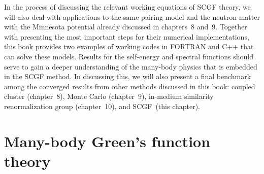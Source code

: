 In the process of discussing the relevant working equations  of SCGF theory, we will also deal with applications to the same pairing model and the neutron matter with the Minnesota potential already discussed in chapters~8 and~9.  Together with presenting the most important steps for their numerical implementations, this book provides two examples of working codes in FORTRAN and C++ that can solve these models.  Results for the self-energy and spectral functions  should serve to gain a deeper understanding of the many-body physics that is embedded in the SCGF method.
 In discussing this, we will also present a final benchmark among the converged results from other methods discussed in this book: coupled cluster (chapter~8),  Monte Carlo (chapter~9),  in-medium similarity renormalization group (chapter~10),  and SCGF~(this chapter).

%


\section{Many-body Green's function theory}
\label{sec:scgf_defs}

 

